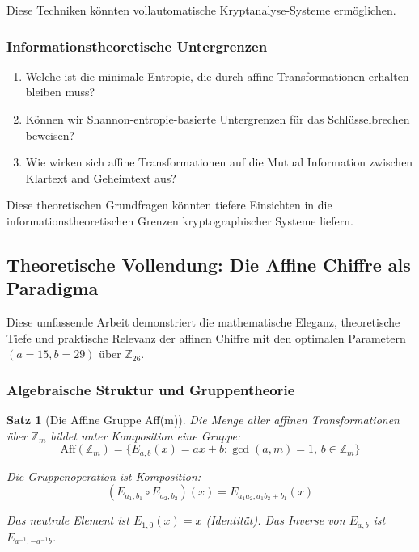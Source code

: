 ﻿\documentclass[12pt,a4paper]{article}
\newtheorem{theorem}{Satz}
\begin{document}
	Diese Techniken könnten vollautomatische Kryptanalyse-Systeme ermöglichen.
	
	\subsubsection{Informationstheoretische Untergrenzen}
	
	\begin{enumerate}
		\item Welche ist die minimale Entropie, die durch affine Transformationen erhalten bleiben muss?
		\item Können wir Shannon-entropie-basierte Untergrenzen für das Schlüsselbrechen beweisen?
		\item Wie wirken sich affine Transformationen auf die Mutual Information zwischen Klartext and Geheimtext aus?
	\end{enumerate}
	
	Diese theoretischen Grundfragen könnten tiefere Einsichten in die informationstheoretischen Grenzen kryptographischer Systeme liefern.
	
	
	\subsection{Theoretische Vollendung: Die Affine Chiffre als Paradigma}
	
	Diese umfassende Arbeit demonstriert die mathematische Eleganz, theoretische Tiefe und praktische Relevanz der affinen Chiffre mit den optimalen Parametern $(a=15, b=29)$ über $\mathbb{Z}_{26}$.
	
	\subsubsection{Algebraische Struktur und Gruppentheorie}
	
	\begin{theorem}[Die Affine Gruppe Aff(m)]
		Die Menge aller affinen Transformationen über $\mathbb{Z}_m$ bildet unter Komposition eine Gruppe:
		\begin{equation}
			\mathrm{Aff}(\mathbb{Z}_m) = \{E_{a,b}(x) = ax + b : \gcd(a, m) = 1, \, b \in \mathbb{Z}_m\}
		\end{equation}
		
		Die Gruppenoperation ist Komposition:
		\begin{equation}
			(E_{a_1, b_1} \circ E_{a_2, b_2})(x) = E_{a_1 a_2, a_1 b_2 + b_1}(x)
		\end{equation}
		
		Das neutrale Element ist $E_{1, 0}(x) = x$ (Identität).
		Das Inverse von $E_{a, b}$ ist $E_{a^{-1}, -a^{-1}b}$.
	\end{theorem}
	
\end{document}
